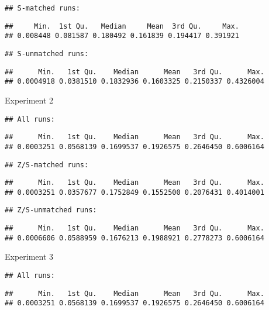 \documentclass[
]{article}
\begin{document}
\begin{verbatim}
## S-matched runs:
\end{verbatim}

\begin{verbatim}
##     Min.  1st Qu.   Median     Mean  3rd Qu.     Max. 
## 0.008448 0.081587 0.180492 0.161839 0.194417 0.391921
\end{verbatim}

\begin{verbatim}
## S-unmatched runs:
\end{verbatim}

\begin{verbatim}
##      Min.   1st Qu.    Median      Mean   3rd Qu.      Max. 
## 0.0004918 0.0381510 0.1832936 0.1603325 0.2150337 0.4326004
\end{verbatim}

Experiment 2

\begin{verbatim}
## All runs:
\end{verbatim}

\begin{verbatim}
##      Min.   1st Qu.    Median      Mean   3rd Qu.      Max. 
## 0.0003251 0.0568139 0.1699537 0.1926575 0.2646450 0.6006164
\end{verbatim}

\begin{verbatim}
## Z/S-matched runs:
\end{verbatim}

\begin{verbatim}
##      Min.   1st Qu.    Median      Mean   3rd Qu.      Max. 
## 0.0003251 0.0357677 0.1752849 0.1552500 0.2076431 0.4014001
\end{verbatim}

\begin{verbatim}
## Z/S-unmatched runs:
\end{verbatim}

\begin{verbatim}
##      Min.   1st Qu.    Median      Mean   3rd Qu.      Max. 
## 0.0006606 0.0588959 0.1676213 0.1988921 0.2778273 0.6006164
\end{verbatim}

Experiment 3

\begin{verbatim}
## All runs:
\end{verbatim}

\begin{verbatim}
##      Min.   1st Qu.    Median      Mean   3rd Qu.      Max. 
## 0.0003251 0.0568139 0.1699537 0.1926575 0.2646450 0.6006164
\end{verbatim}
\end{document}
